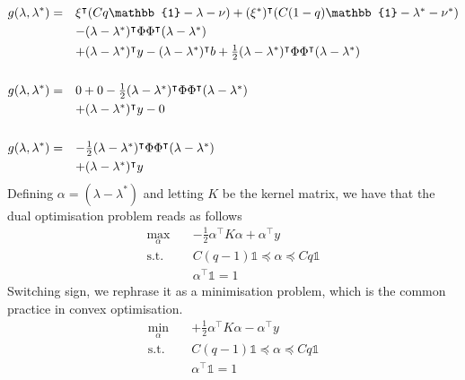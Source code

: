 \begin{equation}
    \begin{split}
        g(\lambda, \lambda^*) = \quad & \hbox{$\xi^\intercal(Cq\mathbb{1} - \lambda - \nu) + (\xi^*)^\intercal(C(1-q)\mathbb{1} - \lambda^* - \nu^*)$} \\
        & \hbox{$- (\lambda - \lambda^*)^\intercal \Phi \Phi^\intercal (\lambda - \lambda^*)$} \\
        & \hbox{$+ (\lambda - \lambda^*)^\intercal y - (\lambda - \lambda^*)^\intercal b + \frac{1}{2} (\lambda - \lambda^*)^\intercal \Phi \Phi^\intercal (\lambda - \lambda^*)$} \\
        \\
        g(\lambda, \lambda^*) = \quad & \hbox{$0 + 0 - \frac{1}{2} (\lambda - \lambda^*)^\intercal \Phi \Phi^\intercal (\lambda - \lambda^*)$} \\
        & \hbox{$+ (\lambda - \lambda^*)^\intercal y - 0$} \\
        \\
        g(\lambda, \lambda^*) = \quad & \hbox{$- \frac{1}{2} (\lambda - \lambda^*)^\intercal \Phi \Phi^\intercal (\lambda - \lambda^*)$} \\
        & \hbox{$+ (\lambda - \lambda^*)^\intercal y$}
    \end{split}
\end{equation}
Defining $\alpha=(\lambda-\lambda^*)$ and letting $K$ be the kernel matrix, we have that the dual optimisation problem reads as follows
\begin{equation}\label{eq:kqr_min6}
    \begin{aligned}
        \max_{\alpha} \quad & -\frac{1}{2}\alpha^\intercal K\alpha+\alpha^\intercal y\\
    \textrm{s.t.} \quad & 
    C(q-1)\mathbb{1}\preceq \alpha \preceq Cq\mathbb{1}\\
    &\alpha^\intercal\mathbb{1}=1
    \end{aligned}
    \end{equation}
Switching sign, we rephrase it as a minimisation problem, which is the common practice in convex optimisation.
\begin{equation}\label{eq:kqr_min7}
    \begin{aligned}
        \min_{\alpha} \quad & +\frac{1}{2}\alpha^\intercal K \alpha-\alpha^\intercal y\\
    \textrm{s.t.} \quad & 
    C(q-1)\mathbb{1}\preceq \alpha \preceq Cq\mathbb{1}\\
    &\alpha^\intercal\mathbb{1}=1
    \end{aligned}
    \end{equation}
